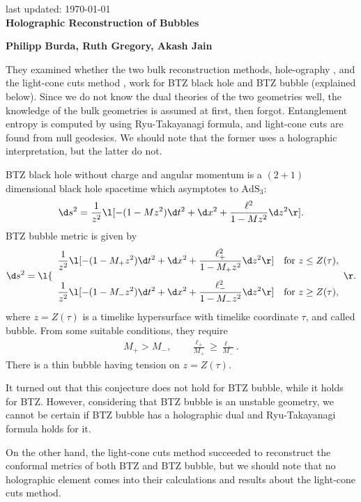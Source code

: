 \documentclass[12pt]{article}
\date{}
\renewcommand{\thefootnote}{\fnsymbol{footnote}}
\begin{document}
{\Large{}
\hfill{\normalsize last updated: \today}
\\[2mm]
\textbf{Holographic Reconstruction of Bubbles\cite{Burda:2018rpb}
}
}

\noindent
\hfill
\textbf{Philipp Burda, Ruth Gregory, Akash Jain}%

\renewcommand{\thefootnote}{\arabic{footnote})}
\setcounter{footnote}{0}
\vspace{12pt}
They examined whether the two bulk reconstruction methods, hole-ography
\cite{Balasubramanian:2013lsa,Czech:2014ppa}, and the light-cone cuts method \cite{Engelhardt:2016wgb}, 
work for BTZ black hole and BTZ bubble (explained below).
Since we do not know the dual theories of the two geometries well,
the knowledge of the bulk geometries is assumed at first, then forgot.
Entanglement entropy is computed by using Ryu-Takayanagi formula, and light-cone cuts are found from null geodesics.
We should note that the former uses a holographic interpretation, but the latter do not.

BTZ black hole without charge and angular momentum is a $(2+1)$ dimensional black hole spacetime which asymptotes to $\mathrm{AdS}_3$:
\begin{align}
	\d s^2 = \frac{1}{z^2}\l[-(1-Mz^2)\d t^2 + \d x^2 + \frac{\ell^2}{1-Mz^2}\d z^2\r].
\end{align}
BTZ bubble metric is given by
\begin{align}
	\d s^2 = 
	\l\{
		\begin{array}{cc}
			\displaystyle \frac{1}{z^2}\l[-(1-M_+z^2)\d t^2 + \d x^2 + \frac{\ell_+^2}{1-M_+z^2}\d z^2\r] & \mathrm{for}~z\le Z(\tau),\\[5mm]
			\displaystyle\frac{1}{z^2}\l[-(1-M_-z^2)\d t^2 + \d x^2 + \frac{\ell_-^2}{1-M_-z^2}\d z^2\r] & \mathrm{for}~z\ge Z(\tau),
		\end{array}
	\r.
\end{align}
where $z = Z(\tau)$ is  a timelike hypersurface with timelike coordinate $\tau$, and called bubble.
From some suitable conditions, they require
\begin{align}
	M_+ > M_-,\qquad \frac{\ell_+}{M_+} \geq \frac{\ell_-}{M_-}.
\end{align}
There is a thin bubble having tension on $z = Z(\tau)$.

It turned out that this conjecture does not hold for BTZ bubble, while it holds for BTZ.
However, considering that BTZ bubble is an unstable geometry, we cannot be certain if
BTZ bubble has a holographic dual and Ryu-Takayanagi formula holds for it.

On the other hand, the light-cone cuts method succeeded to reconstruct the conformal metrics of both BTZ and BTZ bubble,
but we should note that no holographic element comes into their calculations and results about the light-cone cuts method.




 

\end{document}
